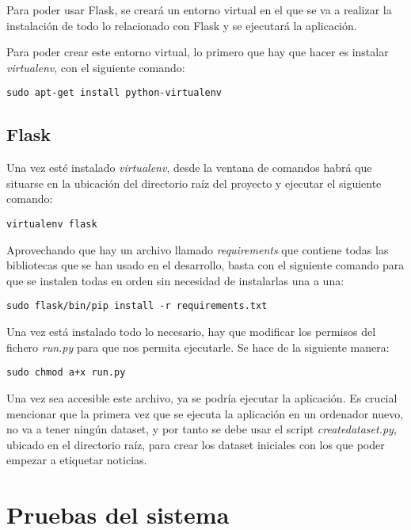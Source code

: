 Para poder usar Flask, se creará un entorno virtual en el que se va a realizar la instalación de todo lo relacionado con Flask y se ejecutará la aplicación.

Para poder crear este entorno virtual, lo primero que hay que hacer es instalar \emph{virtualenv}, con el siguiente comando:

\begin{verbatim}
sudo apt-get install python-virtualenv
\end{verbatim}

\subsection{Flask}

Una vez esté instalado \emph{virtualenv}, desde la ventana de comandos habrá que situarse en la ubicación del directorio raíz del proyecto y ejecutar el siguiente comando:

\begin{verbatim}
virtualenv flask
\end{verbatim}


Aprovechando que hay un archivo llamado \emph{requirements} que contiene todas las bibliotecas que se han usado en el desarrollo, basta con el siguiente comando para que se instalen todas en orden sin necesidad de instalarlas una a una:

\begin{verbatim}
sudo flask/bin/pip install -r requirements.txt
\end{verbatim}


Una vez está instalado todo lo necesario, hay que modificar los permisos del fichero \emph{run.py} para que nos permita ejecutarle. Se hace de la siguiente manera:

\begin{verbatim}
sudo chmod a+x run.py
\end{verbatim}

Una vez sea accesible este archivo, ya se podría ejecutar la aplicación. Es crucial mencionar que la primera vez que se ejecuta la aplicación en un ordenador nuevo, no va a tener ningún dataset, y por tanto se debe usar el script \emph{createdataset.py}, ubicado en el directorio raíz, para crear los dataset iniciales con los que poder empezar a etiquetar noticias.


\section{Pruebas del sistema}

